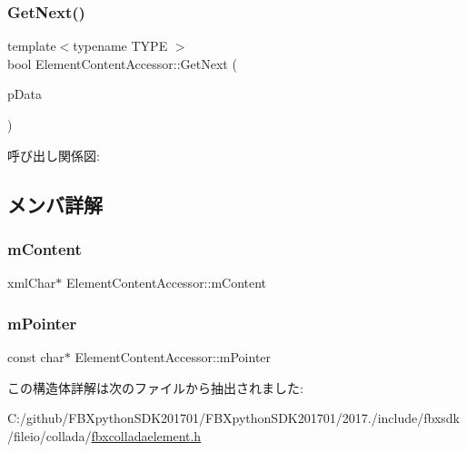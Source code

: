 \subsubsection{\texorpdfstring{Get\+Next()}{GetNext()}}
{\footnotesize\ttfamily template$<$typename T\+Y\+PE $>$ \\
bool Element\+Content\+Accessor\+::\+Get\+Next (\begin{DoxyParamCaption}\item[{T\+Y\+PE $\ast$}]{p\+Data }\end{DoxyParamCaption})}

呼び出し関係図\+:


\subsection{メンバ詳解}
\mbox{\label{struct_element_content_accessor_a3b06ccf10e2deb2e1308bb5bc4bf9532}} 
\subsubsection{\texorpdfstring{m\+Content}{mContent}}
{\footnotesize\ttfamily xml\+Char$\ast$ Element\+Content\+Accessor\+::m\+Content}

\mbox{\label{struct_element_content_accessor_a086d33aecd0a61b63fb21ff4d744e463}} 
\subsubsection{\texorpdfstring{m\+Pointer}{mPointer}}
{\footnotesize\ttfamily const char$\ast$ Element\+Content\+Accessor\+::m\+Pointer}



この構造体詳解は次のファイルから抽出されました\+:\begin{DoxyCompactItemize}
\item 
C\+:/github/\+F\+B\+Xpython\+S\+D\+K201701/\+F\+B\+Xpython\+S\+D\+K201701/2017./include/fbxsdk/fileio/collada/\hyperlink{fbxcolladaelement_8h}{fbxcolladaelement.\+h}\end{DoxyCompactItemize}
